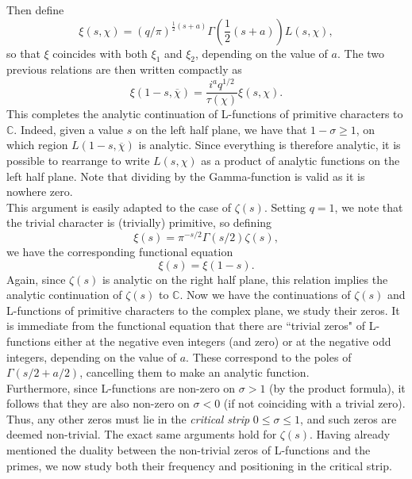 Then define 
\begin{equation}
    \xi(s, \chi) = (q/\pi)^{\frac12(s + a)} \Gamma\left(\frac12 (s + a) \right) L(s, \chi), \nonumber
\end{equation}
so that $\xi$ coincides with both $\xi_1$ and $\xi_2$, depending on the value of $a$. The two previous relations are then written compactly as
\begin{equation}
    \xi(1-s, \overline{\chi}) =  \frac{i^{a}q^{1/2}}{\tau(\chi)} \xi(s, \chi). \nonumber
\end{equation}
This completes the analytic continuation of L-functions of primitive characters to $\mathbb{C}$. Indeed, given a value $s$ on the left half plane, we have that $1-\sigma \geq 1$, on which region $L(1-s, \overline{\chi})$ is analytic. Since everything is therefore analytic, it is possible to rearrange to write $L(s, \chi)$ as a product of analytic functions on the left half plane. Note that dividing by the Gamma-function is valid as it is nowhere zero. \\

This argument is easily adapted to the case of $\zeta(s)$. Setting $q = 1$, we note that the trivial character is (trivially) primitive, so defining
\begin{equation}
    \xi(s) = \pi^{-s/2}\Gamma(s/2)\zeta(s), \nonumber
\end{equation}
we have the corresponding functional equation
\begin{equation}
    \xi(s) = \xi(1-s). \nonumber
\end{equation}
Again, since $\zeta(s)$ is analytic on the right half plane, this relation implies the analytic continuation of $\zeta(s)$ to $\mathbb{C}$. Now we have the continuations of $\zeta(s)$ and L-functions of primitive characters to the complex plane, we study their zeros. It is immediate from the functional equation that there are ``trivial zeros" of L-functions either at the negative even integers (and zero) or at the negative odd integers, depending on the value of $a$. These correspond to the poles of $\Gamma(s/2 + a/2)$, cancelling them to make an analytic function. \\

Furthermore, since L-functions are non-zero on $\sigma > 1$ (by the product formula), it follows that they are also non-zero on $\sigma < 0$ (if not coinciding with a trivial zero). Thus, any other zeros must lie in the \textit{critical strip} $0 \leq \sigma \leq 1$, and such zeros are deemed non-trivial. The exact same arguments hold for $\zeta(s)$. Having already mentioned the duality between the non-trivial zeros of L-functions and the primes, we now study both their frequency and positioning in the critical strip.